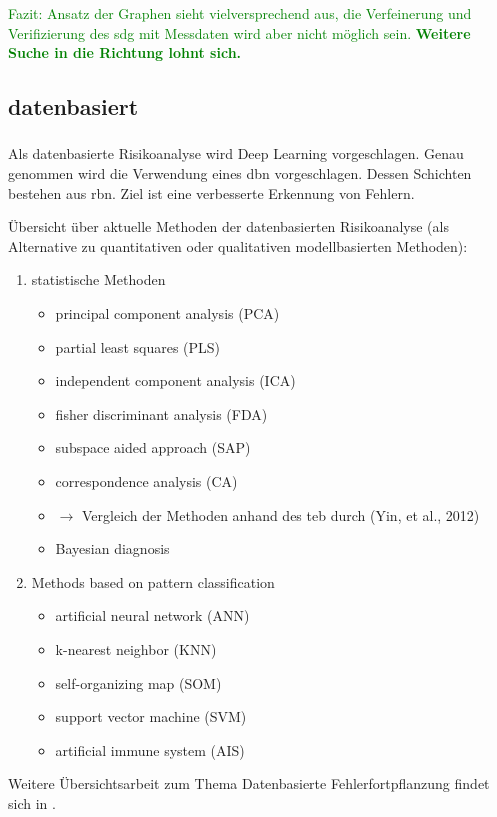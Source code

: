 \textcolor{green}{Fazit: Ansatz der Graphen sieht vielversprechend aus, die Verfeinerung und Verifizierung des \ac{sdg} mit Messdaten wird aber nicht m\"oglich sein. \textbf{Weitere Suche in die Richtung lohnt sich.}}

\subsection{datenbasiert}
\subsubsection{\cite{Zhang_2017}} 
Als datenbasierte Risikoanalyse wird Deep Learning vorgeschlagen. Genau genommen wird die Verwendung eines \ac{dbn} vorgeschlagen. Dessen Schichten bestehen aus \ac{rbn}. Ziel ist eine verbesserte Erkennung von Fehlern.

\"Ubersicht \"uber aktuelle Methoden der datenbasierten Risikoanalyse (als Alternative zu quantitativen oder qualitativen modellbasierten Methoden): \begin{enumerate}
\item statistische Methoden
  \begin{itemize}
  \item principal component analysis (PCA)
  \item partial least squares (PLS)
  \item independent component analysis (ICA)
  \item fisher discriminant analysis (FDA)
  \item subspace aided approach (SAP)
  \item correspondence analysis (CA)
  \item $\rightarrow$ Vergleich der Methoden anhand des \ac{teb} durch  (Yin, et al., 2012)
  \item Bayesian diagnosis 
  \end{itemize}
\item Methods based  on pattern classification
  \begin{itemize}
  \item artificial neural network (ANN)
  \item k-nearest neighbor (KNN) 
  \item self-organizing map (SOM)
  \item support vector machine (SVM) 
  \item artificial immune system (AIS)
  \end{itemize}
\end{enumerate}
Weitere \"Ubersichtsarbeit zum Thema Datenbasierte Fehlerfortpflanzung findet sich in \cite{Thornhill_2006}. 

